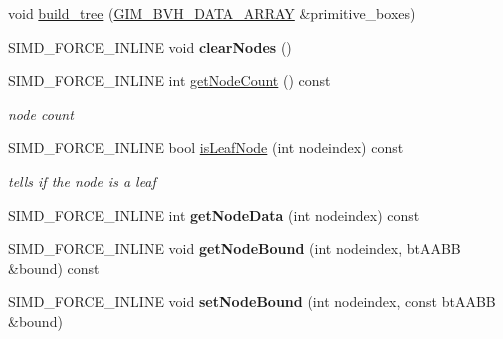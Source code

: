 \textbf{ }\par
\begin{DoxyCompactItemize}
\item 
void \hyperlink{classbtBvhTree_aed589b2985838c6268597f4f64a96c46}{build\+\_\+tree} (\hyperlink{classGIM__BVH__DATA__ARRAY}{G\+I\+M\+\_\+\+B\+V\+H\+\_\+\+D\+A\+T\+A\+\_\+\+A\+R\+R\+AY} \&primitive\+\_\+boxes)
\item 
\mbox{\label{classbtBvhTree_ad9963d9620aad83024c3d01d7c08a341}} 
S\+I\+M\+D\+\_\+\+F\+O\+R\+C\+E\+\_\+\+I\+N\+L\+I\+NE void {\bfseries clear\+Nodes} ()
\item 
\mbox{\label{classbtBvhTree_a08d1a83b6d252b96cfc2a8d512c54c7e}} 
S\+I\+M\+D\+\_\+\+F\+O\+R\+C\+E\+\_\+\+I\+N\+L\+I\+NE int \hyperlink{classbtBvhTree_a08d1a83b6d252b96cfc2a8d512c54c7e}{get\+Node\+Count} () const
\begin{DoxyCompactList}\small\item\em node count \end{DoxyCompactList}\item 
\mbox{\label{classbtBvhTree_a8394787a60291cad85bcf1afc4d94874}} 
S\+I\+M\+D\+\_\+\+F\+O\+R\+C\+E\+\_\+\+I\+N\+L\+I\+NE bool \hyperlink{classbtBvhTree_a8394787a60291cad85bcf1afc4d94874}{is\+Leaf\+Node} (int nodeindex) const
\begin{DoxyCompactList}\small\item\em tells if the node is a leaf \end{DoxyCompactList}\item 
\mbox{\label{classbtBvhTree_ac0813921b278d9891d0e05b49abfd68c}} 
S\+I\+M\+D\+\_\+\+F\+O\+R\+C\+E\+\_\+\+I\+N\+L\+I\+NE int {\bfseries get\+Node\+Data} (int nodeindex) const
\item 
\mbox{\label{classbtBvhTree_acdd8214ed29b797fb3a45d654f53c9e1}} 
S\+I\+M\+D\+\_\+\+F\+O\+R\+C\+E\+\_\+\+I\+N\+L\+I\+NE void {\bfseries get\+Node\+Bound} (int nodeindex, bt\+A\+A\+BB \&bound) const
\item 
\mbox{\label{classbtBvhTree_a789e785f88d84a857ca1931ff85a4b7d}} 
S\+I\+M\+D\+\_\+\+F\+O\+R\+C\+E\+\_\+\+I\+N\+L\+I\+NE void {\bfseries set\+Node\+Bound} (int nodeindex, const bt\+A\+A\+BB \&bound)
\item 

\end{DoxyCompactItemize}
